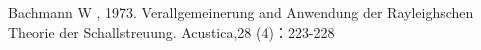 
\begin{thebibliography}{99}
 Bachmann W , 1973.
 Verallgemeinerung and Anwendung der Rayleighschen Theorie der Schallstreuung.
 Acustica,28 (4)：223-228
\end{thebibliography}

